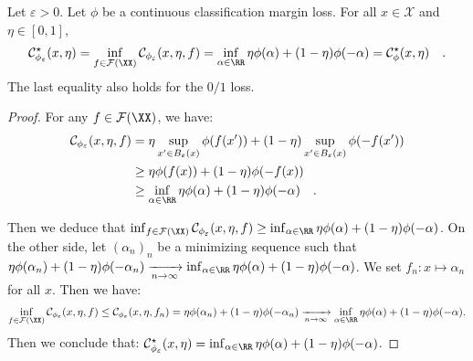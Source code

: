 \begin{prop*}
Let $\varepsilon>0$. Let $\phi$ be a continuous classification margin loss.  For all $x\in\mathcal{X}$ and $\eta\in[0,1]$,
\begin{align*}
    \mathcal{C}^\star_{\phi_\varepsilon}(x,\eta) = \inf_{f\in\mathcal{F}(\XX)}\mathcal{C}_{\phi_\varepsilon}(x,\eta,f) = \inf_{\alpha\in\RR}\eta \phi(\alpha)+(1-\eta)\phi(-\alpha)=\mathcal{C}^\star_\phi(x,\eta)\quad.
\end{align*}
The last equality also holds for the $0/1$ loss.
\end{prop*}
\begin{proof}
For any $f\in \mathcal{F}(\XX)$, we have:
\begin{align*}
 \mathcal{C}_{\phi_\varepsilon}(x,\eta,f)& = \eta \sup_{x'\in B_\varepsilon(x)}\phi(f(x'))+(1-\eta)\sup_{x'\in B_\varepsilon(x)}\phi(-f(x'))\\
& \geq \eta \phi(f(x))+(1-\eta)\phi(-f(x))\\
&\geq \inf_{\alpha\in\RR}\eta \phi(\alpha)+(1-\eta)\phi(-\alpha)\quad.
\end{align*}

Then we deduce that $ \inf_{f\in\mathcal{F}(\XX)}\mathcal{C}_{\phi_\varepsilon}(x,\eta,f)\geq \inf_{\alpha\in\RR}\eta \phi(\alpha)+(1-\eta)\phi(-\alpha)$. On the other side, let $(\alpha_n)_n$ be a minimizing sequence such that $\eta \phi(\alpha_n)+(1-\eta)\phi(-\alpha_n)\xrightarrow[n\to\infty]{}\inf_{\alpha\in\RR}\eta \phi(\alpha)+(1-\eta)\phi(-\alpha)$. We set $f_n:x\mapsto \alpha_n$ for all $x$. Then we have:
\begin{align*}
    \inf_{f\in\mathcal{F}(\XX)}\mathcal{C}_{\phi_\varepsilon}(x,\eta,f) \leq \mathcal{C}_{\phi_\varepsilon}(x,\eta,f_n) = \eta \phi(\alpha_n)+(1-\eta)\phi(-\alpha_n)\xrightarrow[n\to\infty]{} \inf_{\alpha\in\RR}\eta \phi(\alpha)+(1-\eta)\phi(-\alpha).
\end{align*}
Then we conclude that:  $\mathcal{C}_{\phi_\varepsilon}^\star(x,\eta) = \inf_{\alpha\in\RR}\eta \phi(\alpha)+(1-\eta)\phi(-\alpha)$.
\end{proof}


